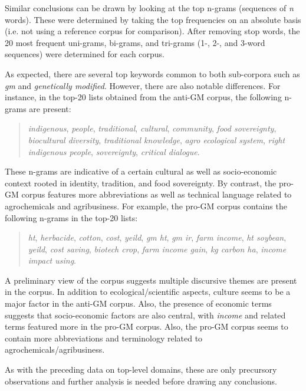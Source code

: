 Similar conclusions can be drawn by looking at the top n-grams (sequences of \textit{n} words). These were determined by taking the top frequencies on an absolute basis (i.e. not using a reference corpus for comparison). After removing stop words, the 20 most frequent uni-grams, bi-grams, and tri-grams (1-, 2-, and 3-word sequences) were determined for each corpus.

As expected, there are several top keywords common to both sub-corpora such as \textit{gm} and \textit{genetically modified}. However, there are also notable differences. For instance, in the top-20 lists obtained from the anti-GM corpus, the following n-grams are present:

\begin{quote}
\textit{indigenous}, \textit{people}, \textit{traditional}, \textit{cultural}, \textit{community}, \textit{food sovereignty}, \textit{biocultural diversity}, \textit{traditional knowledge}, \textit{agro ecological system}, \textit{right indigenous people}, \textit{sovereignty}, \textit{critical dialogue}.   
\end{quote}

These n-grams are indicative of a certain cultural as well as socio-economic context rooted in identity, tradition, and food sovereignty. By contrast, the pro-GM corpus features more abbreviations as well as technical language related to agrochemicals and agribusiness. For example, the pro-GM corpus contains the following n-grams in the top-20 lists:

\begin{quote}
\textit{ht}, \textit{herbacide}, \textit{cotton}, \textit{cost}, \textit{yeild}, \textit{gm ht}, \textit{gm ir}, \textit{farm income}, \textit{ht soybean}, \textit{yeild}, \textit{cost saving}, \textit{biotech crop}, \textit{farm income gain}, \textit{kg carbon ha}, \textit{income impact using}. 
\end{quote}

A preliminary view of the corpus suggests multiple discursive themes are present in the corpus. In addition to ecological/scientific aspects, culture seems to be a major factor in the anti-GM corpus. Also, the presence of economic terms suggests that socio-economic factors are also central, with \textit{income} and related terms featured more in the pro-GM corpus. Also, the pro-GM corpus seems to contain more abbreviations and terminology related to agrochemicals/agribusiness. 

As with the preceding data on top-level domains, these are only precursory observations and further analysis is needed before drawing any conclusions. 


